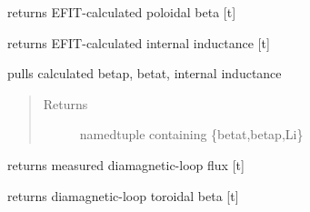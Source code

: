 \documentclass[letterpaper,10pt,english]{sphinxmanual}
\begin{document}
\begin{fulllineitems}
\begin{fulllineitems}
\end{fulllineitems}


\begin{fulllineitems}
\label{eqtools:eqtools.EFIT.EFITTree.getBetaP}
returns EFIT-calculated poloidal beta {[}t{]}

\end{fulllineitems}


\begin{fulllineitems}
\label{eqtools:eqtools.EFIT.EFITTree.getLi}
returns EFIT-calculated internal inductance {[}t{]}

\end{fulllineitems}


\begin{fulllineitems}
\label{eqtools:eqtools.EFIT.EFITTree.getBetas}
pulls calculated betap, betat, internal inductance
\begin{quote}\begin{description}
\item[{Returns}] \leavevmode
namedtuple containing \{betat,betap,Li\}

\end{description}\end{quote}

\end{fulllineitems}


\begin{fulllineitems}
\label{eqtools:eqtools.EFIT.EFITTree.getDiamagFlux}
returns measured diamagnetic-loop flux {[}t{]}

\end{fulllineitems}


\begin{fulllineitems}
\label{eqtools:eqtools.EFIT.EFITTree.getDiamagBetaT}
returns diamagnetic-loop toroidal beta {[}t{]}


\end{fulllineitems}
\end{fulllineitems}
\end{document}
